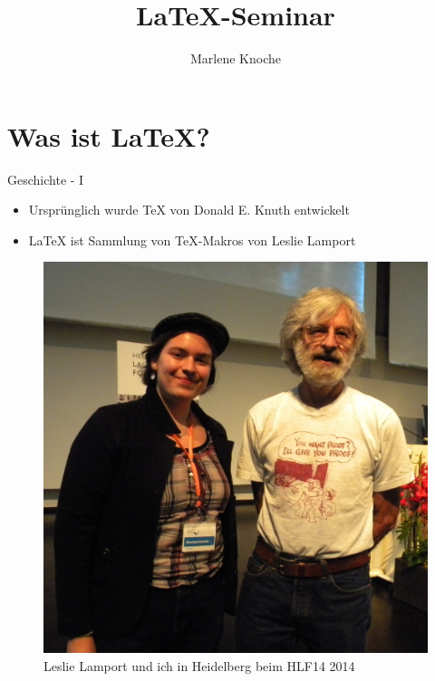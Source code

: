\documentclass{beamer}
\author{Marlene Knoche}
\title{\LaTeX-Seminar}
\begin{document}
\begin{frame}

\maketitle

\end{frame}

\begin{frame}

\tableofcontents

\end{frame}

\section{Was ist \LaTeX?}

\begin{frame}{Geschichte - I}
\begin{itemize}
\item Ursprünglich wurde \TeX\; von Donald E. Knuth entwickelt
\item \LaTeX\; ist Sammlung von \TeX-Makros von Leslie Lamport 
\end{itemize}

\begin{figure}
\centering
\includegraphics[scale=0.5]{pics/leslielamport.jpg}
\caption{Leslie Lamport und ich in Heidelberg beim HLF14 2014}
\end{figure}
\end{frame}
\end{document}
